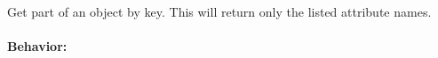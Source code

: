 Get part of an object by key.  This will return only the listed attribute names.

\paragraph{Behavior:}
\begin{itemize}[noitemsep]

\end{itemize}
